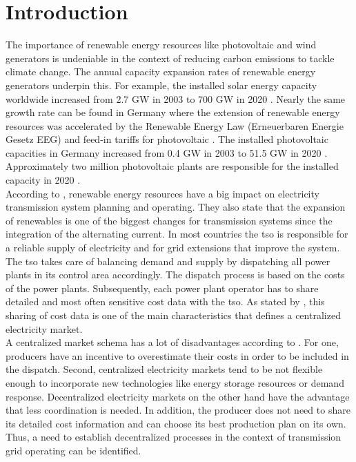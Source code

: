 \section{Introduction}
\label{sec:intro}

The importance of renewable energy resources like photovoltaic and wind generators is undeniable in the context of reducing carbon emissions to tackle climate change. The annual capacity expansion rates of renewable energy generators underpin this. For example, the installed solar energy capacity worldwide increased from 2.7 GW in 2003 to 700 GW in 2020 \citep{ritchie2020}. Nearly the same growth rate can be found in Germany where the extension of renewable energy resources was accelerated by the Renewable Energy Law (Erneuerbaren Energie Gesetz EEG) and feed-in tariffs for photovoltaic \citep{pesch2014}. The installed photovoltaic capacities in Germany increased from 0.4 GW in 2003 to 51.5 GW in 2020 \citep{bundesnetzagentur2021}. Approximately two million photovoltaic plants are responsible for the installed capacity in 2020 \citep{bundesnetzagentur2021}.\\

According to \citet{quint2019}, renewable energy resources have a big impact on electricity transmission system planning and operating. They also state that the expansion of renewables is one of the biggest changes for transmission systems since the integration of the alternating current. In most countries the \gls{tso} is responsible for a reliable supply of electricity and for grid extensions that improve the system. The \gls{tso} takes care of balancing demand and supply by dispatching all power plants in its control area accordingly. The dispatch process is based on the costs of the power plants. Subsequently, each power plant operator has to share detailed and most often sensitive cost data with the \gls{tso}. As stated by \citet{ahlqvist2022}, this sharing of cost data is one of the main characteristics that defines a centralized electricity market. \\

A centralized market schema has a lot of disadvantages according to \citet{ahlqvist2022}. For one, producers have an incentive to overestimate their costs in order to be included in the dispatch. Second, centralized electricity markets tend to be not flexible enough to incorporate new technologies like energy storage resources or demand response. Decentralized electricity markets on the other hand have the advantage that less coordination is needed. In addition, the producer does not need to share its detailed cost information and can choose its best production plan \citep{ahlqvist2022} on its own. Thus, a need to establish decentralized processes in the context of transmission grid operating can be identified. \\

